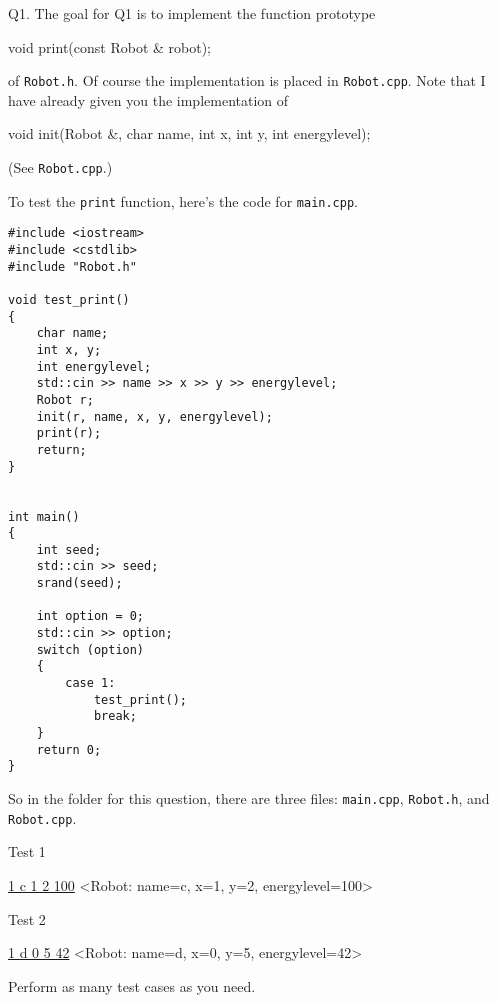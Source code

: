 Q1.
The goal for Q1 is to implement the function prototype
{\small
\begin{console}
void print(const Robot & robot);
\end{console}
}
of \verb!Robot.h!.
Of course the implementation is placed in \verb!Robot.cpp!.
Note that I have already given you the implementation of
{\small
\begin{console}
void init(Robot &, char name, int x, int y, int energylevel);
\end{console}
}
(See \verb!Robot.cpp!.)

To test the \verb!print! function, 
here's the code for \verb!main.cpp!.
{\small
\begin{Verbatim}[frame=single]
#include <iostream>
#include <cstdlib>
#include "Robot.h"

void test_print()
{
    char name;
    int x, y;
    int energylevel;
    std::cin >> name >> x >> y >> energylevel;
    Robot r;
    init(r, name, x, y, energylevel);
    print(r);
    return;
}


int main()
{
    int seed;
    std::cin >> seed;
    srand(seed);

    int option = 0;
    std::cin >> option;
    switch (option)
    {
        case 1:
            test_print();
            break;
    }
    return 0;
}      
\end{Verbatim}
}
So in the folder for this question,
there are three files:
\verb!main.cpp!,
\verb!Robot.h!, and \verb!Robot.cpp!.


Test 1
\begin{console}[commandchars=\\\{\}]
\underline{1 c 1 2 100}
<Robot: name=c, x=1, y=2, energylevel=100>
\end{console}

Test 2
\begin{console}[commandchars=\\\{\}]
\underline{1 d 0 5 42}
<Robot: name=d, x=0, y=5, energylevel=42>
\end{console}


Perform as many test cases as you need.

